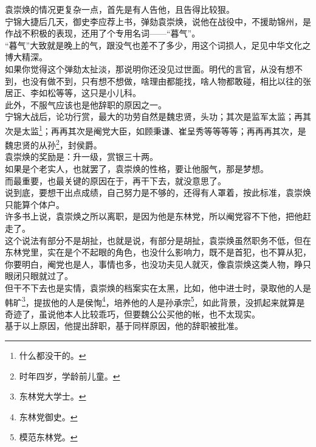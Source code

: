 \begin{multicols}{\theparacolNo}
袁崇焕的情况更复杂一点，首先是有人告他，且告得比较狠。\\

宁锦大捷后几天，御史李应荐上书，弹劾袁崇焕，说他在战役中，不援助锦州，是作战不积极的表现，还用了个专用名词——“暮气”。\\

“暮气”大致就是晚上的气，跟没气也差不了多少，用这个词损人，足见中华文化之博大精深。\\

如果你觉得这个弹劾太扯淡，那说明你还没见过世面。明代的言官，从没有想不到，也没有做不到，只有想不想做，啥理由都能找，啥人物都敢碰，相比以往的张居正、李如松等等，这只是小儿科。\\

此外，不服气应该也是他辞职的原因之一。\\

宁锦大战后，论功行赏，最大的功劳自然是魏忠贤，头功；其次是监军太监；再其次是太监\footnote{什么都没干的。}；再再其次是阉党大臣，如顾秉谦、崔呈秀等等等等；再再再其次，是魏忠贤的从孙\footnote{时年四岁，学龄前儿童。}，封侯爵。\\

袁崇焕的奖励是：升一级，赏银三十两。\\

如果是个老实人，也就罢了，袁崇焕的性格，要让他服气，那是梦想。\\

而最重要，也最关键的原因在于，再干下去，就没意思了。\\

说到底，要想干出点成绩，自己努力是不够的，还得有人罩着，按此标准，袁崇焕只能算个体户。\\

许多书上说，袁崇焕之所以离职，是因为他是东林党，所以阉党容不下他，把他赶走了。\\

这个说法有部分不是胡扯，也就是说，有部分是胡扯，袁崇焕虽然职务不低，但在东林党里，实在是个不起眼的角色，也没什么影响力，既不是首犯，也不算从犯，你要明白，阉党也是人，事情也多，也没功夫见人就灭，像袁崇焕这类人物，睁只眼闭只眼就过了。\\

但干不下去也是实情，袁崇焕的档案实在太黑，比如，他中进士时，录取他的人是韩旷\footnote{东林党大学士。}，提拔他的人是侯恂\footnote{东林党御史。}，培养他的人是孙承宗\footnote{模范东林党。}，如此背景，没抓起来就算是奇迹了，虽说他本人比较乖巧，但要魏公公买他的帐，也不太现实。\\

基于以上原因，他提出辞职，基于同样原因，他的辞职被批准。\\


\end{multicols}
